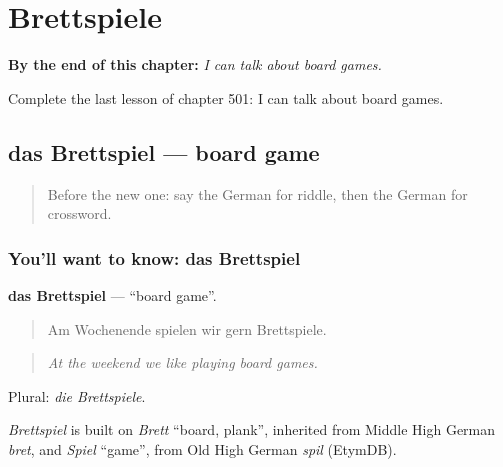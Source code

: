 
\chapter{Brettspiele}
\label{ch:ge-brettspiele}

\begin{chapteropening}
\textbf{By the end of this chapter:} \emph{I can talk about board games.}

Complete the last lesson of chapter 501: I can talk about board games.
\end{chapteropening}

\section[das Brettspiel]{das Brettspiel — board game}

\label{lesson:GE-C501-brettspiel}



\begin{quote}
Before the new one: say the German for riddle, then the German for crossword.
\end{quote}

\subsection*{You'll want to know: das Brettspiel}
\textbf{das Brettspiel} — \textquotedblleft{}board game\textquotedblright{}.

\begin{quote}
Am Wochenende spielen wir gern Brettspiele.
\end{quote}

\begin{quote}
\emph{At the weekend we like playing board games.}
\end{quote}

Plural: \emph{die Brettspiele}.

\begin{cousinweb}
\emph{Brettspiel} is built on \emph{Brett} \textquotedblleft{}board, plank\textquotedblright{}, inherited from Middle High German \emph{bret}, and \emph{Spiel} \textquotedblleft{}game\textquotedblright{}, from Old High German \emph{spil} (EtymDB).
\end{cousinweb}

